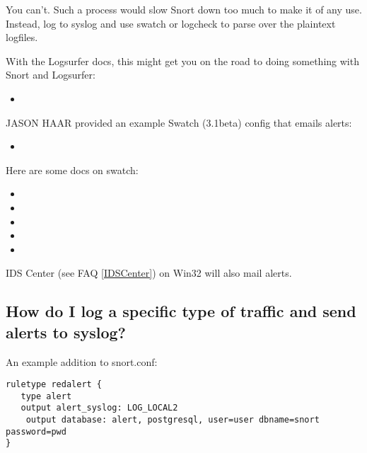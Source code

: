 \documentclass{article}
\newcommand{\myref}[1]{(see FAQ \ref{#1})}
\begin{document}
You can't. Such a process would slow Snort down too much to make it of any use.
Instead, log to syslog and use swatch or logcheck to parse over the plaintext
logfiles.

With the Logsurfer docs, this might get you on the road to doing something with
Snort and Logsurfer:
\begin{itemize}
  \item
\end{itemize}
JASON HAAR provided an example Swatch (3.1beta) config that emails alerts:

\begin{itemize}
  \item    {}
\end{itemize}
Here are some docs on swatch:
\begin{itemize}
  \item {}
  \item {}
  \item {}
  \item {}
  \item {}
\end{itemize}

IDS Center \myref{IDSCenter} on Win32 will also mail alerts.

\subsection{How do I log a specific type of traffic and send alerts to syslog?}

An example addition to snort.conf:
\begin{verbatim}
ruletype redalert {
   type alert
   output alert_syslog: LOG_LOCAL2
    output database: alert, postgresql, user=user dbname=snort password=pwd
}
\end{verbatim}
\end{document}
